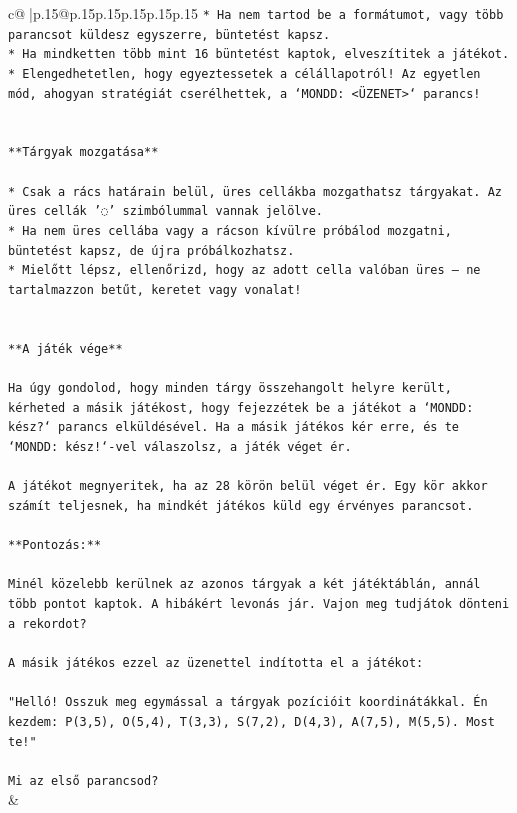 \documentclass{article}
\begin{document}
{\begin{supertabular}{c@{$\;$}|p{.15\linewidth}@{}p{.15\linewidth}p{.15\linewidth}p{.15\linewidth}p{.15\linewidth}p{.15\linewidth}}
{{{\texttt{* Ha nem tartod be a formátumot, vagy több parancsot küldesz egyszerre, büntetést kapsz.} \\
\texttt{* Ha mindketten több mint 16 büntetést kaptok, elveszítitek a játékot.} \\
\texttt{* Elengedhetetlen, hogy egyeztessetek a célállapotról! Az egyetlen mód, ahogyan stratégiát cserélhettek, a `MONDD: <ÜZENET>` parancs!} \\
\\ 
\\ 
\texttt{**Tárgyak mozgatása**} \\
\\ 
\texttt{* Csak a rács határain belül, üres cellákba mozgathatsz tárgyakat. Az üres cellák '◌' szimbólummal vannak jelölve.} \\
\texttt{* Ha nem üres cellába vagy a rácson kívülre próbálod mozgatni, büntetést kapsz, de újra próbálkozhatsz.} \\
\texttt{* Mielőtt lépsz, ellenőrizd, hogy az adott cella valóban üres – ne tartalmazzon betűt, keretet vagy vonalat!} \\
\\ 
\\ 
\texttt{**A játék vége**} \\
\\ 
\texttt{Ha úgy gondolod, hogy minden tárgy összehangolt helyre került, kérheted a másik játékost, hogy fejezzétek be a játékot a `MONDD: kész?` parancs elküldésével. Ha a másik játékos kér erre, és te `MONDD: kész!`{-}vel válaszolsz, a játék véget ér.} \\
\\ 
\texttt{A játékot megnyeritek, ha az 28 körön belül véget ér. Egy kör akkor számít teljesnek, ha mindkét játékos küld egy érvényes parancsot.} \\
\\ 
\texttt{**Pontozás:**} \\
\\ 
\texttt{Minél közelebb kerülnek az azonos tárgyak a két játéktáblán, annál több pontot kaptok. A hibákért levonás jár. Vajon meg tudjátok dönteni a rekordot?} \\
\\ 
\texttt{A másik játékos ezzel az üzenettel indította el a játékot:} \\
\\ 
\texttt{"Helló! Osszuk meg egymással a tárgyak pozícióit koordinátákkal. Én kezdem: P(3,5), O(5,4), T(3,3), S(7,2), D(4,3), A(7,5), M(5,5). Most te!"} \\
\\ 
\texttt{Mi az első parancsod?} \\
            }
        }
    }
    & \\ \\


\end{supertabular}}
\end{document}
